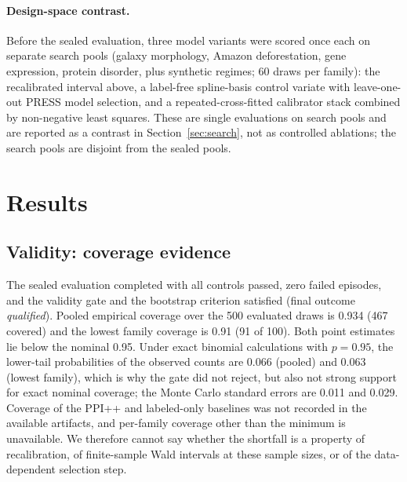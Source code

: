 \documentclass{article}
\begin{document}
\paragraph{Design-space contrast.} Before the sealed evaluation, three model variants were scored once each on separate search pools (galaxy morphology, Amazon deforestation, gene expression, protein disorder, plus synthetic regimes; 60 draws per family): the recalibrated interval above, a label-free spline-basis control variate with leave-one-out PRESS model selection, and a repeated-cross-fitted calibrator stack combined by non-negative least squares. These are single evaluations on search pools and are reported as a contrast in Section~\ref{sec:search}, not as controlled ablations; the search pools are disjoint from the sealed pools.

\section{Results}\label{sec:results}
\subsection{Validity: coverage evidence}\label{sec:validity}
The sealed evaluation completed with all controls passed, zero failed episodes, and the validity gate and the bootstrap criterion satisfied (final outcome \emph{qualified}). Pooled empirical coverage over the 500 evaluated draws is 0.934 (467 covered) and the lowest family coverage is 0.91 (91 of 100). %
Both point estimates lie below the nominal 0.95. Under exact binomial calculations with $p=0.95$, the lower-tail probabilities of the observed counts are 0.066 (pooled) and 0.063 (lowest family), %
which is why the gate did not reject, but also not strong support for exact nominal coverage; the Monte Carlo standard errors are 0.011 and 0.029. %
Coverage of the PPI++ and labeled-only baselines was not recorded in the available artifacts, and per-family coverage other than the minimum is unavailable. We therefore cannot say whether the shortfall is a property of recalibration, of finite-sample Wald intervals at these sample sizes, or of the data-dependent selection step.
\end{document}
